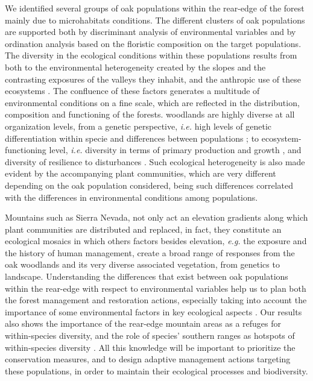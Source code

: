 We identified several groups of oak populations within the rear-edge of the \Qp forest mainly due to microhabitats conditions. The different clusters of oak populations are supported both by discriminant analysis of environmental variables and by ordination analysis based on the floristic composition on the target populations. The diversity in the ecological conditions within these populations results from both to the environmental heterogeneity created by the slopes and the contrasting exposures of the valleys they inhabit, and the anthropic use of these ecosystems \autocites[\emph{e.g.}][]{NavarroGonzalezetal2013WeightLanduse,PerezLuqueetal2020LanduseLegacies}. The confluence of these factors generates a multitude of environmental conditions on a fine scale, which are reflected in the distribution, composition and functioning of the \Qpy forests.
\Qpy woodlands are highly diverse at all organization levels, from a genetic perspective, \emph{i.e.} high levels of genetic differentiation within specie \autocite{ValbuenaCarabanaGil2013GeneticResilience} and differences between populations \autocite{ValbuenaCarabanaGil2011EvaluacionEstructura}; to ecosystem-functioning level, \emph{i.e.} diversity in terms of primary production and growth \autocite{PerezLuqueetal2015OntologicalSystem,AlcarazSeguraetal2016ChangesVegetation}, and diversity of resilience to disturbances \autocite[\emph{e.g.}][]{PerezLuqueetal2020LanduseLegacies}. Such ecological heterogeneity is also made evident by the accompanying plant communities, which are very different depending on the oak population considered, being such differences correlated with the differences in environmental conditions among populations.

Mountains such as Sierra Nevada, not only act an elevation gradients along which plant communities are distributed and replaced, in fact, they constitute an ecological mosaics in which others factors besides elevation, \emph{e.g.} the exposure and the history of human management, create a broad range of responses from the oak woodlands and its very diverse associated vegetation, from genetics to landscape. Understanding the differences that exist between oak populations within the rear-edge with respect to environmental variables help us to plan both the forest management and restoration actions, especially taking into account the importance of some environmental factors in key ecological aspects \autocites[\emph{e.g.} regeneration and growth,][]{GomezAparicioetal2008OakSeedling,PerezLuqueetal2020LanduseLegacies}. Our results also shows the importance of the rear-edge mountain areas as a refuges for within-species diversity, and the role of species' southern ranges as hotspots of within-species diversity \autocite{Jumpetal2010MonitoringManaging,HampeJump2011ClimateRelicts}. All this knowledge will be important to prioritize the conservation measures, and to design adaptive management actions targeting these populations, in order to maintain their ecological processes and biodiversity.
